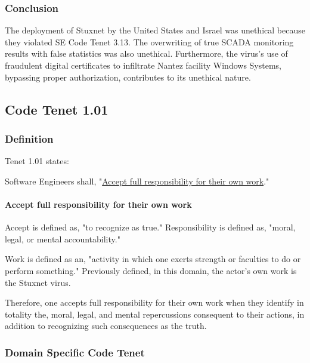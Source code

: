 \documentclass[12pt]{article}
\begin{document}
\begin{multicols}{2}
\subsubsection{Conclusion}

The deployment of Stuxnet by the United States and Israel was unethical because they violated SE Code Tenet 3.13. The overwriting of true SCADA monitoring results with false statistics was also unethical. Furthermore, the virus's use of fraudulent digital certificates to infiltrate Nantez facility Windows Systems, bypassing proper authorization, contributes to its unethical nature.

\subsection{Code Tenet 1.01}

\subsubsection{Definition}

Tenet 1.01 states:
\begin{framed}
Software Engineers shall, "\ul{Accept full responsibility for their own work}."\cite{softwareEngineeringCodeOfEthics}
\end{framed}

\paragraph{Accept full responsibility for their own work}

Accept is defined as, "to recognize as true."\cite{merriamWebsterDefinitions} Responsibility is defined as, "moral, legal, or mental accountability."\cite{merriamWebsterDefinitions}

Work is defined as an, "activity in which one exerts strength or faculties to do or perform something."\cite{cambridgeDictionary} Previously defined, in this domain, the actor's own work is the Stuxnet virus.

Therefore, one accepts full responsibility for their own work when they identify in totality  the, moral, legal, and mental repercussions consequent to their actions, in addition to recognizing such consequences as the truth.\cite{cambridgeDictionary}

\subsubsection{Domain Specific Code Tenet}


\end{multicols}
\end{document}
